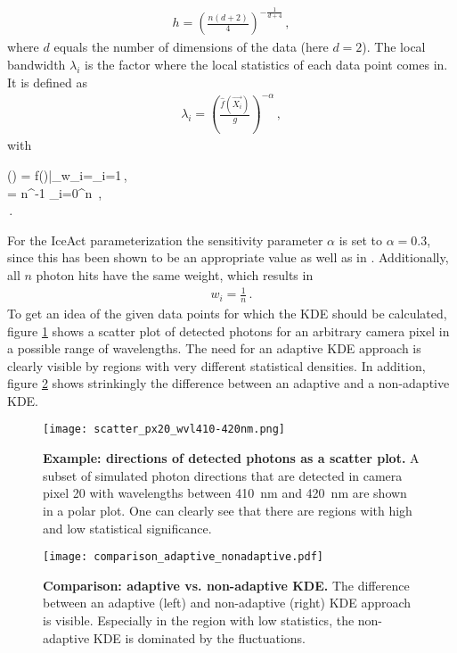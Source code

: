 \begin{align}
	h = \left(\frac{n(d+2)}{4}\right)^{-\frac{1}{d+4}}\,,
\end{align}
where $d$ equals the number of dimensions of the data (here $d=2$). The local bandwidth $\lambda_i$ is the factor where the local statistics of each data point comes in. It is defined as \cite{kde:schoenen,kde:wangwang}
\begin{align}
	\lambda_i = \left(\frac{\hat{f}(\vec{X_i})}{g}\right)^{-\alpha}\,,
\end{align}
with
\begin{vardescription}
	() = f()|_{w_i=\lambda_i=1}\,,\\
	 = n^{-1} \sum_{i=0}^{n} \,,\\
	\alpha\in[0,1]\,.
\end{vardescription}
For the IceAct parameterization the sensitivity parameter $\alpha$ is set to $\alpha=\num{0.3}$, since this has been shown to be an appropriate value as well as in \cite{kde:schoenen}. Additionally, all $n$ photon hits have the same weight, which results in \cite{kde:schoenen,kde:wangwang}
\begin{align}
	w_i = \frac{1}{n}\,.
\end{align}
To get an idea of the given data points for which the KDE should be calculated, figure \ref{kde:example_scatter} shows a scatter plot of detected photons for an arbitrary camera pixel in a possible range of wavelengths. The need for an adaptive KDE approach is clearly visible by regions with very different statistical densities. In addition, figure \ref{kde:comparison} shows strinkingly the difference between an adaptive and a non-adaptive KDE.

\begin{figure}[h]
	\centering
	\texttt{[image: scatter\_px20\_wvl410-420nm.png]}
	\caption[Example: directions of detected photons as a scatter plot]{\textbf{Example: directions of detected photons as a scatter plot.} A subset of simulated photon directions that are detected in camera pixel 20 with wavelengths between \SI{410}{\nano\meter} and \SI{420}{\nano\meter} are shown in a polar plot. One can clearly see that there are regions with high and low statistical significance.}
	\label{kde:example_scatter}	
\end{figure}

\begin{figure}[h]
	\centering
	\texttt{[image: comparison\_adaptive\_nonadaptive.pdf]}
	\caption[Comparison: adaptive vs. non-adaptive KDE]{\textbf{Comparison: adaptive vs. non-adaptive KDE.} The difference between an adaptive (left) and non-adaptive (right) KDE approach is visible. Especially in the region with low statistics, the non-adaptive KDE is dominated by the fluctuations.}
	\label{kde:comparison}	
\end{figure}

